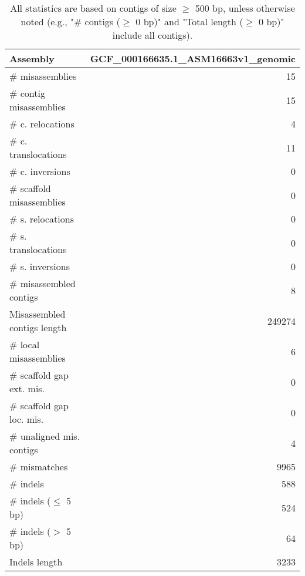 \documentclass[12pt,a4paper]{article}
\begin{document}
\begin{table}[ht]
\begin{center}
\caption{All statistics are based on contigs of size $\geq$ 500 bp, unless otherwise noted (e.g., "\# contigs ($\geq$ 0 bp)" and "Total length ($\geq$ 0 bp)" include all contigs).}
\begin{tabular}{|l*{1}{|r}|}
\hline
Assembly & GCF\_000166635.1\_ASM16663v1\_genomic \\ \hline
\# misassemblies & 15 \\ \hline
\hspace{2mm}\# contig misassemblies & 15 \\ \hline
\hspace{5mm}\# c. relocations & 4 \\ \hline
\hspace{5mm}\# c. translocations & 11 \\ \hline
\hspace{5mm}\# c. inversions & 0 \\ \hline
\hspace{2mm}\# scaffold misassemblies & 0 \\ \hline
\hspace{5mm}\# s. relocations & 0 \\ \hline
\hspace{5mm}\# s. translocations & 0 \\ \hline
\hspace{5mm}\# s. inversions & 0 \\ \hline
\# misassembled contigs & 8 \\ \hline
Misassembled contigs length & 249274 \\ \hline
\# local misassemblies & 6 \\ \hline
\# scaffold gap ext. mis. & 0 \\ \hline
\# scaffold gap loc. mis. & 0 \\ \hline
\# unaligned mis. contigs & 4 \\ \hline
\# mismatches & 9965 \\ \hline
\# indels & 588 \\ \hline
\hspace{5mm}\# indels ($\leq$ 5 bp) & 524 \\ \hline
\hspace{5mm}\# indels ($>$ 5 bp) & 64 \\ \hline
Indels length & 3233 \\ \hline
\end{tabular}
\end{center}
\end{table}
\end{document}
